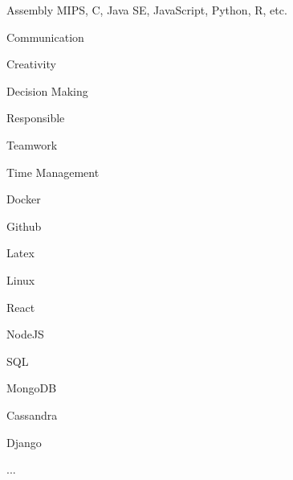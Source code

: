 \begin{cventries}
    \cventry
    {
    	\begin{cvitems}
    		Assembly MIPS,  C, Java SE, JavaScript, Python, R, etc.
    	\end{cvitems}
    }
        {}
   		{}
   		{}
   		{}
        
\end{cventries}
\begin{cventries}
    \cventry
        {}
        {}
        {}
        {}
        {
            \begin{cvitems}
                \item Communication
                \item Creativity
                \item Decision Making
                \item Responsible
                \item Teamwork
                \item Time Management
            \end{cvitems}
        }
\end{cventries}
\begin{cventries}
    \cventry
        {}
        {}
        {}
        {}
        {
            \begin{cvitems}
                \item Docker
                \item Github
                \item Latex
                \item Linux
                \item React
                \item NodeJS
                \item SQL
                \item MongoDB
                \item Cassandra
                \item Django
                \item ...
            \end{cvitems}
        }
\end{cventries}
